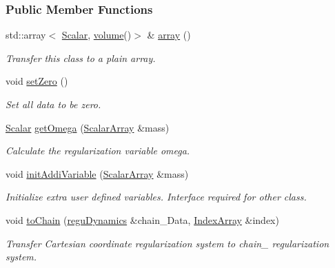 \subsubsection*{Public Member Functions}
\begin{DoxyCompactItemize}
\item 
std\+::array$<$ \mbox{\hyperlink{classregu_dynamics_a359c55370b4dee032396f0df86ad5fab}{Scalar}}, \mbox{\hyperlink{classregu_dynamics_a3a00b2009ce88898871ca024c30c6882}{volume}}()$>$ \& \mbox{\hyperlink{classregu_dynamics_aa1c12cfc524f02a52590b2659db79795}{array}} ()
\begin{DoxyCompactList}\small\item\em Transfer this class to a plain array. \end{DoxyCompactList}\item 
void \mbox{\hyperlink{classregu_dynamics_a50e6ec7efc990c325d3694e225f04194}{set\+Zero}} ()
\begin{DoxyCompactList}\small\item\em Set all data to be zero. \end{DoxyCompactList}\item 
\mbox{\hyperlink{classregu_dynamics_a359c55370b4dee032396f0df86ad5fab}{Scalar}} \mbox{\hyperlink{classregu_dynamics_a0fe3b4f9a468687ec1f004120b347ddd}{get\+Omega}} (\mbox{\hyperlink{classregu_dynamics_a34b4b77ea3e49e1cdef584ec8bd281dc}{Scalar\+Array}} \&mass)
\begin{DoxyCompactList}\small\item\em Calculate the regularization variable omega. \end{DoxyCompactList}\item 
void \mbox{\hyperlink{classregu_dynamics_aa42158ddf3c5385aa89988b9bb80ff29}{init\+Addi\+Variable}} (\mbox{\hyperlink{classregu_dynamics_a34b4b77ea3e49e1cdef584ec8bd281dc}{Scalar\+Array}} \&mass)
\begin{DoxyCompactList}\small\item\em Initialize extra user defined variables. Interface required for other class. \end{DoxyCompactList}\item 
void \mbox{\hyperlink{classregu_dynamics_aae4e77bbbb00f0bdddb396047f1c0fc2}{to\+Chain}} (\mbox{\hyperlink{classregu_dynamics}{regu\+Dynamics}} \&chain_\+Data, \mbox{\hyperlink{classregu_dynamics_a2c9fa7372e4a11be9d85728b4a0e455f}{Index\+Array}} \&index)
\begin{DoxyCompactList}\small\item\em Transfer Cartesian coordinate regularization system to chain_ regularization system. \end{DoxyCompactList}\item

\end{DoxyCompactItemize}
